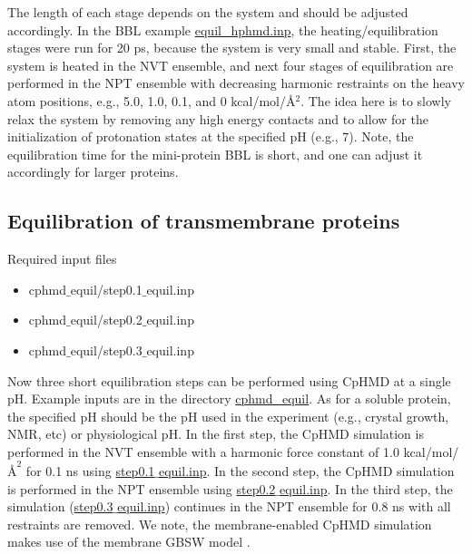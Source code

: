The length of each stage depends on the system and should be adjusted accordingly.
In the BBL example \href{https://gitlab.com/shenlab-amber-cphmd/cphmd-tutorial/-/tree/main/hphmd_charmm/bbl_equil_prod}{equil\_hphmd.inp},
the heating/equilibration stages were run for 20 ps, 
because the system is very small and stable. 
First, the system is heated in the NVT ensemble, and next
four stages of equilibration are performed in the NPT ensemble with decreasing harmonic restraints on the heavy atom positions, e.g., 5.0, 1.0, 0.1, and 0 kcal/mol/{\AA}$^2$. 
The idea here is to slowly relax the system by removing any high energy contacts and to allow for the initialization of protonation states at the specified pH (e.g., 7).
Note, the equilibration time for the mini-protein BBL
is short, and one can adjust it accordingly for larger proteins.

\subsection{Equilibration of transmembrane proteins}

\begin{checklist}{Required input files}
\begin{itemize}
\item  cphmd$\_$equil/step0.1$\_$equil.inp
\item  cphmd$\_$equil/step0.2$\_$equil.inp
\item  cphmd$\_$equil/step0.3$\_$equil.inp
\end{itemize}
\end{checklist}

Now three short equilibration steps can be performed using CpHMD at a single pH.
Example inputs are in the directory \href{https://gitlab.com/shenlab-amber-cphmd/cphmd-tutorial/-/tree/main/memb_hphmd_charmm/cphmd_equil}{cphmd\_equil}. 
As for a soluble protein, the specified pH should be the pH used in the experiment (e.g., crystal growth, NMR, etc) or physiological pH.
In the first step, the CpHMD simulation is performed 
in the NVT ensemble
with a harmonic force constant of 1.0 kcal/mol/$\mbox{\AA}^2$ for 0.1 ns using
\href{https://gitlab.com/shenlab-amber-cphmd/cphmd-tutorial/-/tree/main/memb_hphmd_charmm/cphmd_equil}{step0.1$\_$equil.inp}.
In the second step, the CpHMD simulation is performed in the NPT ensemble using
\href{https://gitlab.com/shenlab-amber-cphmd/cphmd-tutorial/-/tree/main/memb_hphmd_charmm/cphmd_equil}{step0.2$\_$equil.inp}.
In the third step, the simulation (\href{https://gitlab.com/shenlab-amber-cphmd/cphmd-tutorial/-/tree/main/memb_hphmd_charmm/cphmd_equil}{step0.3$\_$equil.inp}) continues in the NPT ensemble for 0.8 ns with all restraints are removed. 
We note, the membrane-enabled CpHMD simulation makes use of the membrane GBSW model
\cite{Im_Brooks_2003_Biophys.J.}.

